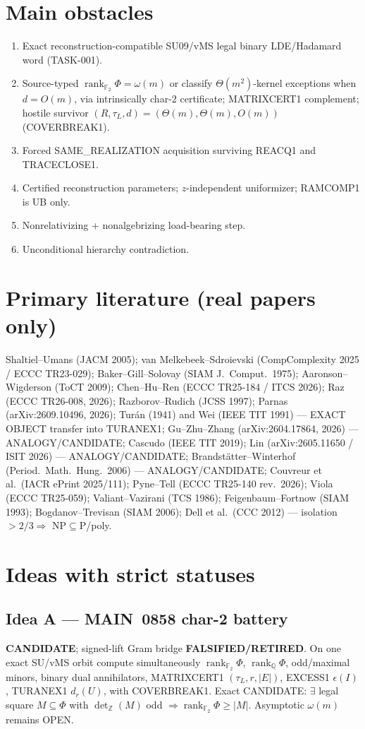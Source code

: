 \documentclass[11pt]{article}
\begin{document}
\section*{Main obstacles}
\begin{enumerate}
\item Exact reconstruction-compatible SU09/vMS legal binary LDE/Hadamard word (TASK-001).
\item Source-typed $\operatorname{rank}_{\mathbb F_2}\Phi=\omega(m)$ or classify $\Theta(m^2)$-kernel
exceptions when $d=O(m)$, via intrinsically char-$2$ certificate; MATRIXCERT1 complement;
hostile survivor $(R,\tau_L,d)=(\Theta(m),\Theta(m),O(m))$ (COVERBREAK1).
\item Forced SAME\_REALIZATION acquisition surviving REACQ1 and TRACECLOSE1.
\item Certified reconstruction parameters; $z$-independent uniformizer; RAMCOMP1 is UB only.
\item Nonrelativizing + nonalgebrizing load-bearing step.
\item Unconditional hierarchy contradiction.
\end{enumerate}

\section*{Primary literature (real papers only)}
Shaltiel--Umans (JACM 2005); van Melkebeek--Sdroievski (CompComplexity 2025 / ECCC TR23-029);
Baker--Gill--Solovay (SIAM J.\ Comput.\ 1975); Aaronson--Wigderson (ToCT 2009);
Chen--Hu--Ren (ECCC TR25-184 / ITCS 2026); Raz (ECCC TR26-008, 2026);
Razborov--Rudich (JCSS 1997); Parnas (arXiv:2609.10496, 2026);
Tur\'an (1941) and Wei (IEEE TIT 1991) --- EXACT OBJECT transfer into TURANEX1;
Gu--Zhu--Zhang (arXiv:2604.17864, 2026) --- ANALOGY/CANDIDATE;
Cascudo (IEEE TIT 2019); Lin (arXiv:2605.11650 / ISIT 2026) --- ANALOGY/CANDIDATE;
Brandst\"atter--Winterhof (Period.\ Math.\ Hung.\ 2006) --- ANALOGY/CANDIDATE;
Couvreur et al.\ (IACR ePrint 2025/111); Pyne--Tell (ECCC TR25-140 rev.\ 2026);
Viola (ECCC TR25-059); Valiant--Vazirani (TCS 1986); Feigenbaum--Fortnow (SIAM 1993);
Bogdanov--Trevisan (SIAM 2006); Dell et al.\ (CCC 2012) --- isolation $>2/3\Rightarrow$ NP$\subseteq$P/poly.

\section*{Ideas with strict statuses}
\subsection*{Idea A --- MAIN~0858 char-2 battery}
\textbf{CANDIDATE}; signed-lift Gram bridge \textbf{FALSIFIED/RETIRED}.
On one exact SU/vMS orbit compute simultaneously $\operatorname{rank}_{\mathbb F_2}\Phi$,
$\operatorname{rank}_{\mathbb Q}\Phi$, odd/maximal minors, binary dual annihilators,
MATRIXCERT1 $(\tau_L,r,|E|)$, EXCESS1 $\epsilon(I)$, TURANEX1 $d_r(U)$, with COVERBREAK1.
Exact CANDIDATE: $\exists$ legal square $M\subseteq\Phi$ with $\det_{\mathbb Z}(M)$ odd
$\Rightarrow\operatorname{rank}_{\mathbb F_2}\Phi\ge|M|$. Asymptotic $\omega(m)$ remains OPEN.
\end{document}
